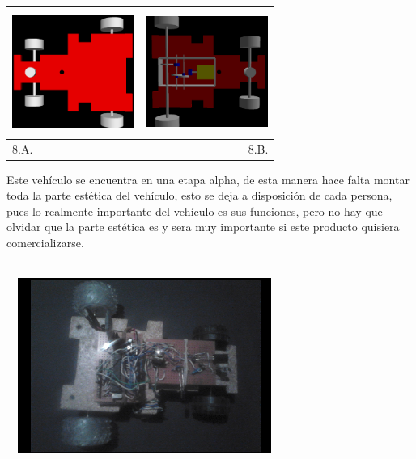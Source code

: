 \documentclass[12]{article}
\newenvironment{Figure}
{\par\medskip\noindent\minipage{\linewidth}}
{\endminipage\par\medskip}
\begin{document}
\begin{multicols}{2}
\begin{Figure}	
\center
\begin{tabular}{|l|r|}
\hline
\includegraphics[width=4cm, height=4cm]{img/montaje1.png} & \includegraphics[width=4cm, height=4cm]{img/montaje2.png} \\ \hline
8.A. & 8.B. \\ \hline
\end{tabular}
\label{fig:g8}
\end{Figure}
\vspace{0.6 cm}

Este vehículo se encuentra en una etapa alpha, de esta manera hace falta montar toda la parte estética del vehículo, esto se deja a disposición de cada persona, pues lo realmente importante del vehículo es sus funciones, pero no hay que olvidar que la parte estética es y sera muy importante si este producto quisiera comercializarse.  \\\\

\begin{Figure}	
\center
\includegraphics[width=9cm, height=5.7cm]{img/cap6.png} 
\label{fig:g9}
\end{Figure}
\vspace{0.6 cm}


\end{multicols}
\end{document}
